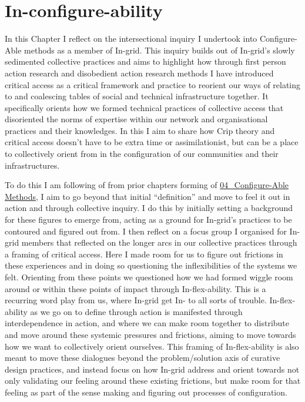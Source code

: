 \hypertarget{in-configure-ability}{%
\section{In-configure-ability}\label{in-configure-ability}}

In this Chapter I reflect on the intersectional inquiry I undertook into
Configure-Able methods as a member of In-grid. This inquiry builds out
of In-grid's slowly sedimented collective practices and aims to
highlight how through first person action research and disobedient
action research methods I have introduced critical access as a critical
framework and practice to reorient our ways of relating to and
coalescing tables of social and technical infrastructure together. It
specifically orients how we formed technical practices of collective
access that disoriented the norms of expertise within our network and
organisational practices and their knowledges. In this I aim to share
how Crip theory and critical access doesn't have to be extra time or
assimilationist, but can be a place to collectively orient from in the
configuration of our communities and their infrastructures.

To do this I am following of from prior chapters forming of
\href{../../04_Configure-able_Methods/04_Configure-Able\%20Methods.md}{04\_Configure-Able
Methods}, I aim to go beyond that initial ``definition'' and move to
feel it out in action and through collective inquiry. I do this by
initially setting a background for these figures to emerge from, acting
as a ground for In-grid's practices to be contoured and figured out
from. I then reflect on a focus group I organised for In-grid members
that reflected on the longer arcs in our collective practices through a
framing of critical access. Here I made room for us to figure out
frictions in these experiences and in doing so questioning the
inflexibilities of the systems we felt. Orienting from these points we
questioned how we had formed wiggle room around or within these points
of impact through In-flex-ability. This is a recurring word play from
us, where In-grid get In- to all sorts of trouble. In-flex-ability as we
go on to define through action is manifested through interdependence in
action, and where we can make room together to distribute and move
around these systemic pressures and frictions, aiming to move towards
how we want to collectively orient ourselves. This framing of
In-flex-ability is also meant to move these dialogues beyond the
problem/solution axis of curative design practices, and instead focus on
how In-grid address and orient towards not only validating our feeling
around these existing frictions, but make room for that feeling as part
of the sense making and figuring out processes of configuration.

